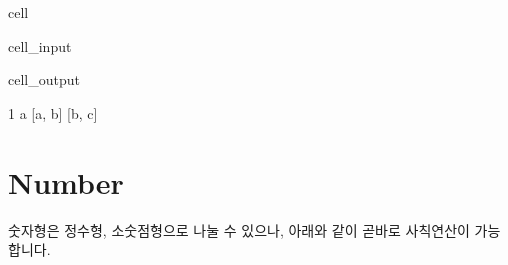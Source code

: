 \documentclass[letterpaper,10pt,english]{jupyterBook}
\begin{document}
\begin{sphinxuseclass}{cell}\begin{sphinxVerbatimInput}

\begin{sphinxuseclass}{cell_input}
\begin{sphinxVerbatim}[commandchars=\\\{\}]
  \PYG{p}{[}\PYG{p}{]}
   \PYG{p}{[}\PYG{p}{]}

\PYG{p}{[}\PYG{p}{]}
\PYG{p}{[}\PYG{p}{]}
\PYG{p}{[}\PYG{p}{]} 
\PYG{p}{[}\PYG{p}{]} 
\end{sphinxVerbatim}

\end{sphinxuseclass}\end{sphinxVerbatimInput}
\begin{sphinxVerbatimOutput}

\begin{sphinxuseclass}{cell_output}
\begin{sphinxVerbatim}[commandchars=\\\{\}]
1
a
[\PYGZsq{}a\PYGZsq{}, \PYGZsq{}b\PYGZsq{}]
[\PYGZsq{}b\PYGZsq{}, \PYGZsq{}c\PYGZsq{}]
\end{sphinxVerbatim}

\end{sphinxuseclass}\end{sphinxVerbatimOutput}

\end{sphinxuseclass}

\part{Number}
\label{\detokenize{chapter2/2.1.1_Python_Basics:number}}
\sphinxAtStartPar
숫자형은 정수형, 소숫점형으로 나눌 수 있으나, 아래와 같이 곧바로 사칙연산이 가능합니다.
\end{document}
